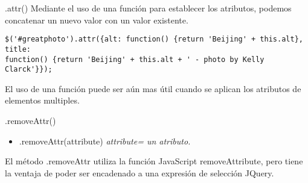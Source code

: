 \begin{frame}[fragile]{.attr()} %
Mediante el uso de una función para establecer los atributos, podemos concatenar un nuevo valor con un valor existente.
\begin{lstlisting}
$('#greatphoto').attr({alt: function() {return 'Beijing' + this.alt}, title:
function() {return 'Beijing' + this.alt + ' - photo by Kelly Clarck'}});
\end{lstlisting}
El uso de una función puede ser aún mas útil cuando se aplican los atributos de
elementos multiples.
\end{frame}

\begin{frame}[fragile]{.removeAttr()} %
\begin{itemize}
    \item .removeAttr(attribute) \textit{ attribute= un atributo.}
\end{itemize}
El método .removeAttr utiliza la función JavaScript removeAttribute, pero tiene
la ventaja de poder ser encadenado a una expresión de selección JQuery.
\end{frame}


